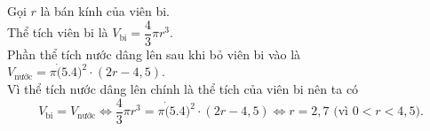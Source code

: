 \begin{ex}
{\begin{center}
		\end{center}
		Gọi $r$ là bán kính của viên bi.\\
		Thể tích viên bi là $V_{\textrm{bi}} = \dfrac{4}{3}\pi r^3$.\\
		Phần thể tích nước dâng lên sau khi bỏ viên bi vào là $V_{\textrm{nước}} = \pi\dot (5.4)^2\cdot (2r - 4{,}5)$.\\
		Vì thể tích nước dâng lên chính là thể tích của viên bi nên ta có 
		$$V_{\textrm{bi}} = V_{\textrm{nước}} \Leftrightarrow \dfrac{4}{3}\pi r^3 = \pi\dot (5.4)^2\cdot (2r - 4{,}5) \Leftrightarrow r = 2{,}7 \textrm{ (vì $0 < r < 4{,}5$).} $$
	}
\end{ex}

